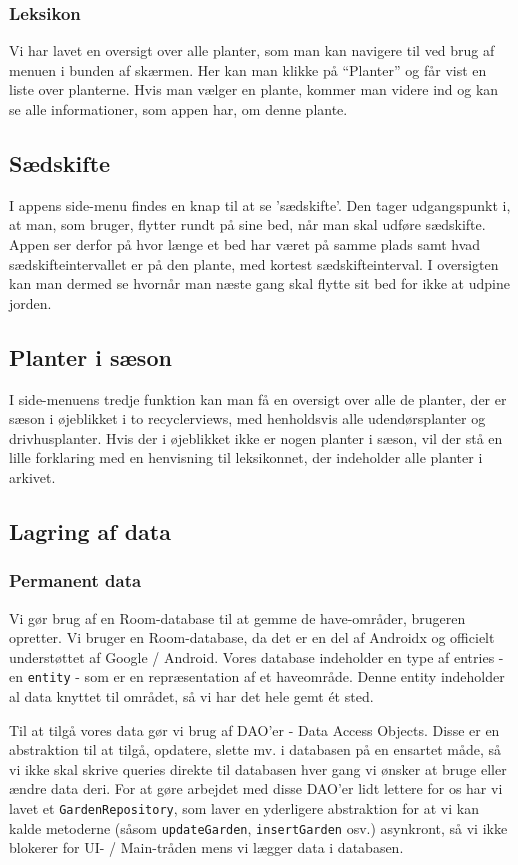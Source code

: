 \subsubsection{Leksikon}

Vi har lavet en oversigt over alle planter, som man kan navigere til ved brug af menuen i bunden af skærmen. Her kan man klikke på ``Planter'' og får vist en liste over planterne. Hvis man vælger en plante, kommer man videre ind og kan se alle informationer, som appen har, om denne plante.

\subsection{Sædskifte}
I appens side-menu findes en knap til at se 'sædskifte'. Den tager udgangspunkt i, at man, som bruger, flytter rundt på sine bed, når man skal udføre sædskifte. Appen ser derfor på hvor længe et bed har været på samme plads samt hvad sædskifteintervallet er på den plante, med kortest sædskifteinterval. I oversigten kan man dermed se hvornår man næste gang skal flytte sit bed for ikke at udpine jorden. 

\subsection{Planter i sæson}
I side-menuens tredje funktion kan man få en oversigt over alle de planter, der er sæson i øjeblikket i to recyclerviews, med henholdsvis alle udendørsplanter og drivhusplanter. Hvis der i øjeblikket ikke er nogen planter i sæson, vil der stå en lille forklaring med en henvisning til leksikonnet, der indeholder alle planter i arkivet.

\subsection{Lagring af data}

\subsubsection{Permanent data}
Vi gør brug af en Room-database til at gemme de have-områder, brugeren opretter. Vi bruger en Room-database, da det er en del af Androidx og officielt understøttet af Google / Android. Vores database indeholder en type af entries - en \texttt{entity} - som er en repræsentation af et haveområde. Denne entity indeholder al data knyttet til området, så vi har det hele gemt ét sted.

Til at tilgå vores data gør vi brug af DAO'er - Data Access Objects. Disse er en abstraktion til at tilgå, opdatere, slette mv. i databasen på en ensartet måde, så vi ikke skal skrive queries direkte til databasen hver gang vi ønsker at bruge eller ændre data deri.
For at gøre arbejdet med disse DAO'er lidt lettere for os har vi lavet et \texttt{GardenRepository}, som laver en yderligere abstraktion for at vi kan kalde metoderne (såsom \texttt{updateGarden}, \texttt{insertGarden} osv.) asynkront, så vi ikke blokerer for UI- / Main-tråden mens vi lægger data i databasen.


